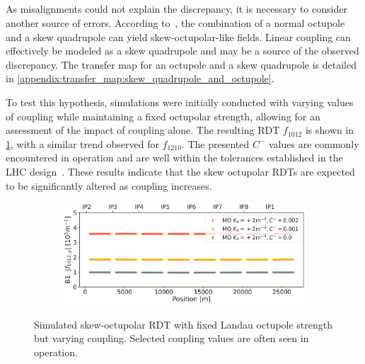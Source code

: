 \FloatBarrier
\subsection{}

As misalignments could not explain the discrepancy, it is necessary to consider another source of
errors. According to~\cite{bazzani_normal_1994}, the combination of a normal octupole and a skew
quadrupole can yield skew-octupolar-like fields. Linear coupling can effectively be modeled as a
skew quadrupole and may be a source of the observed discrepancy. The transfer map for an octupole
and a skew quadrupole is detailed in \cref{appendix:transfer_map:skew_quadrupole_and_octupole}.

To test this hypothesis, simulations were initially conducted with varying values of coupling while
maintaining a fixed octupolar strength, allowing for an assessment of the impact of coupling alone.
The resulting RDT $f_{1012}$ is shown in \cref{fig:skew_octupolar:sim_coupling}, with a similar
trend observed for $f_{1210}$. The presented $C^{-}$ values are commonly encountered in
operation and are well within the tolerances established in the LHC design~\cite{bruning_lhc_2004}.
These results indicate that the skew octupolar RDTs are expected to be significantly altered as
coupling increases.


\begin{figure}[!htb]
    \centering
    \begin{subfigure}{0.8\textwidth}
        \includegraphics[width=\textwidth]{./images/skew_octupoles/f1012_coupling_sim_AMP.pdf}
    \end{subfigure}
    \caption{Simulated skew-octupolar RDT with fixed Landau octupole strength but varying coupling.
    Selected coupling values are often seen in operation.}
    \label{fig:skew_octupolar:sim_coupling}
\end{figure}



